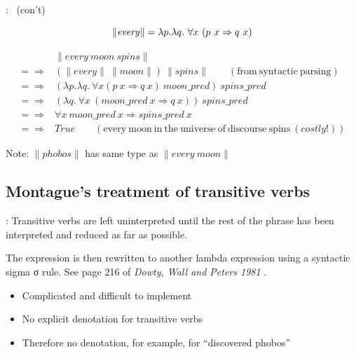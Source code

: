 \documentclass[logoontitle,tabu,supertabular,aspectratio=43]{preney-uwindsor-beamer}
\newcommand{\phobos}{\mathit{phobos}}
\newcommand{\every}{\mathit{every}}
\newcommand{\spins}{\mathit{spins}}
\newcommand{\moon}{\mathit{moon}}
\newcommand{\meaningof}[1]{\lVert #1 \rVert}
\newcommand{\wordpred}[1]{\mathit{#1\_pred}}
\newcommand{\True}{\mathit{True}}
\begin{document}
    \begin{frame}{\insertsection: \insertsubsection\ (con't)}

        \begin{equation*}
            \meaningof{\every} = \lambda p.\lambda q. \  \forall x \  (p \  x \Rightarrow q \  x) \\
        \end{equation*}

        \begin{equation*}
            \begin{split}
                & \meaningof{\every \  \moon \  \spins} \\
                =\!\Rightarrow&  (\meaningof{\every} \  \meaningof{\moon}) \  \meaningof{\spins} \qquad(\mathrm{from}\ \mathrm{syntactic}\ \mathrm{parsing}) \\
                =\!\Rightarrow&  (\lambda p.\lambda q.\ \forall x (p \  x \Rightarrow q \  x) \  \wordpred{\moon}) \  \wordpred{\spins} \\
                =\!\Rightarrow&  (\lambda q.\ \forall x \  (\wordpred{\moon} \   x \Rightarrow q \   x)) \  \wordpred{spins} \\
                =\!\Rightarrow&  \forall x \  \wordpred{\moon} \   x \Rightarrow \wordpred{spins} \   x \\
                =\!\Rightarrow&  \True \qquad(\mathrm{every}\ \mathrm{moon}\ \mathrm{in}\ \mathrm{the}\ \mathrm{universe \ of\ discourse}\ \mathrm{spins}\ (\mathit{costly!}))
            \end{split}
        \end{equation*}
        \centering

        Note: $\meaningof{\phobos}$ has same type as $\meaningof{\every\ \moon}$

    \end{frame}

    \subsection{Montague’s treatment of transitive verbs}
    \begin{frame}{\insertsection: \insertsubsection}
        Transitive verbs are left uninterpreted until the rest of the phrase has been interpreted and reduced as far as possible.

        The expression is then rewritten to another lambda expression using a syntactic
        sigma σ rule. See page 216 of \textit{Dowty, Wall and Peters 1981}\cite{Dowty:wall} .

        \begin{itemize}
            \item Complicated and difficult to implement

            \item No explicit denotation for transitive verbs

            \item Therefore no denotation, for example, for ``discovered phobos''
        \end{itemize}
    \end{frame}
\end{document}
